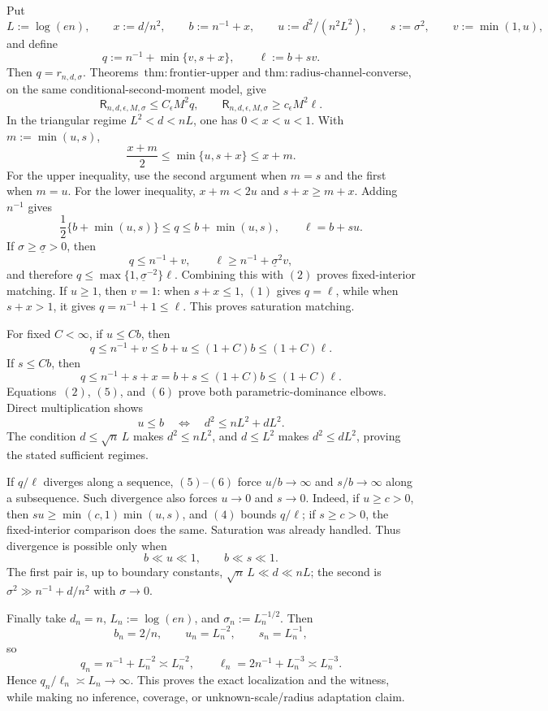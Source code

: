 Put
\[
 L:=\log(en),\qquad x:=d/n^2,\qquad b:=n^{-1}+x,\qquad
 u:=d^2/(n^2L^2),\qquad s:=\sigma^2,\qquad v:=\min(1,u),
\]
and define
\[
 q:=n^{-1}+\min\{v,s+x\},\qquad \ell:=b+sv.
\tag{1}
\]
Then \(q=r_{n,d,\sigma}\).  Theorems~\(\mathrm{thm:frontier\text{-}upper}\) and \(\mathrm{thm:radius\text{-}channel\text{-}converse}\), on the same conditional-second-moment model, give
\[
 \mathsf R_{n,d,\epsilon,M,\sigma}\le C_\epsilon M^2q,
 \qquad
 \mathsf R_{n,d,\epsilon,M,\sigma}\ge c_\epsilon M^2\ell.
\tag{2}
\]
In the triangular regime \(L^2<d<nL\), one has \(0<x<u<1\).  With \(m:=\min(u,s)\),
\[
 \frac{x+m}{2}\le\min\{u,s+x\}\le x+m.
\tag{3}
\]
For the upper inequality, use the second argument when \(m=s\) and the first when \(m=u\).  For the lower inequality, \(x+m<2u\) and \(s+x\ge m+x\).  Adding \(n^{-1}\) gives
\[
 \frac12\{b+\min(u,s)\}\le q\le b+\min(u,s),
 \qquad \ell=b+su.
\tag{4}
\]
If \(\sigma\ge\underline\sigma>0\), then
\[
 q\le n^{-1}+v,\qquad \ell\ge n^{-1}+\underline\sigma^2v,
\]
and therefore \(q\le\max\{1,\underline\sigma^{-2}\}\ell\).  Combining this with \((2)\) proves fixed-interior matching.  If \(u\ge1\), then \(v=1\): when \(s+x\le1\), \((1)\) gives \(q=\ell\), while when \(s+x>1\), it gives \(q=n^{-1}+1\le\ell\).  This proves saturation matching.

For fixed \(C<\infty\), if \(u\le Cb\), then
\[
 q\le n^{-1}+v\le b+u\le(1+C)b\le(1+C)\ell.
\tag{5}
\]
If \(s\le Cb\), then
\[
 q\le n^{-1}+s+x=b+s\le(1+C)b\le(1+C)\ell.
\tag{6}
\]
Equations~\((2)\), \((5)\), and \((6)\) prove both parametric-dominance elbows.  Direct multiplication shows
\[
 u\le b\quad\Longleftrightarrow\quad d^2\le nL^2+dL^2.
\tag{7}
\]
The condition \(d\le\sqrt n\,L\) makes \(d^2\le nL^2\), and \(d\le L^2\) makes \(d^2\le dL^2\), proving the stated sufficient regimes.

If \(q/\ell\) diverges along a sequence, \((5)\)--\((6)\) force \(u/b\to\infty\) and \(s/b\to\infty\) along a subsequence.  Such divergence also forces \(u\to0\) and \(s\to0\).  Indeed, if \(u\ge c>0\), then \(su\ge\min(c,1)\min(u,s)\), and \((4)\) bounds \(q/\ell\); if \(s\ge c>0\), the fixed-interior comparison does the same.  Saturation was already handled.  Thus divergence is possible only when
\[
 b\ll u\ll1,\qquad b\ll s\ll1.
\tag{8}
\]
The first pair is, up to boundary constants, \(\sqrt n\,L\ll d\ll nL\); the second is \(\sigma^2\gg n^{-1}+d/n^2\) with \(\sigma\to0\).

Finally take \(d_n=n\), \(L_n:=\log(en)\), and \(\sigma_n:=L_n^{-1/2}\).  Then
\[
 b_n=2/n,\qquad u_n=L_n^{-2},\qquad s_n=L_n^{-1},
\]
so
\[
 q_n=n^{-1}+L_n^{-2}\asymp L_n^{-2},\qquad
 \ell_n=2n^{-1}+L_n^{-3}\asymp L_n^{-3}.
\]
Hence \(q_n/\ell_n\asymp L_n\to\infty\).  This proves the exact localization and the witness, while making no inference, coverage, or unknown-scale/radius adaptation claim.